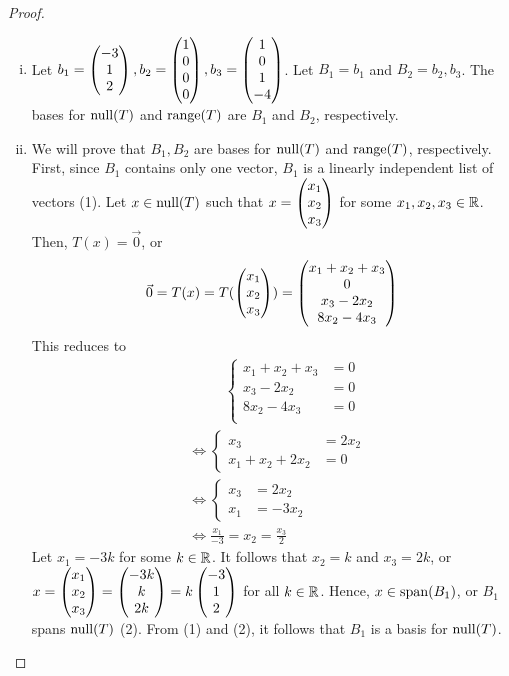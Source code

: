 \begin{proof}
    \renewcommand{\qedsymbol}{$\blacksquare$}
    \begin{enumerate}[(i)]
        \item Let $b_1=\begin{pmatrix} -3\\ 1\\ 2\end{pmatrix},b_2=\begin{pmatrix} 1\\ 0\\0 \\ 0\end{pmatrix},b_3=\begin{pmatrix} 1\\ 0\\1 \\ -4\end{pmatrix}$. Let $B_1=b_1$ and $B_2=b_2,b_3$. The bases for $\textnormal{null}(T)$ and $\textnormal{range}(T)$ are $B_1$ and $B_2$, respectively.
        \item We will prove that $B_1,B_2$ are bases for $\textnormal{null}(T)$ and $\textnormal{range}(T)$, respectively. 
        First, since $B_1$ contains only one vector, $B_1$ is a linearly independent list of vectors (1).
        Let $x\in\textnormal{null}(T)$ such that $x=\begin{pmatrix} x_1\\ x_2\\ x_3\end{pmatrix}$ for some $x_1,x_2,x_3\in\mathbb R$.
        Then, $T(x)=\vec{0}$, or 
        \[
            \begin{aligned}
                \vec{0} = T(x) = T(\begin{pmatrix} x_1\\ x_2\\ x_3\end{pmatrix}) = \begin{pmatrix} x_1+x_2+x_3\\ 0\\x_3-2x_2 \\ 8x_2-4x_3\end{pmatrix}      
            \end{aligned}
        \]
        This reduces to
        \begin{align*}
            &\qquad \ \ \,
            \begin{cases}
                x_1+x_2+x_3&=0\\
                x_3-2x_2&=0\\
                8x_2-4x_3&=0\\
            \end{cases}\\&\iff
            \begin{cases}
                x_3&=2x_2\\
                x_1+x_2+2x_2&=0
            \end{cases}\\&\iff
            \begin{cases}
                x_3&=2x_2\\
                x_1&=-3x_2
            \end{cases}\\
            &\iff \frac{x_1}{-3}=x_2=\frac{x_3}{2}
        \end{align*}
        Let $x_1=-3k$ for some $k\in\mathbb R$. It follows that $x_2=k$ and $x_3=2k$, or $x=\begin{pmatrix} x_1\\ x_2\\ x_3\end{pmatrix}=\begin{pmatrix} -3k\\ k\\ 2k\end{pmatrix}=k \begin{pmatrix} -3\\ 1\\ 2\end{pmatrix}$ for all $k\in\mathbb R$. Hence, $x\in\textnormal{span}(B_1)$, or $B_1$ spans $\textnormal{null}(T)$ (2).
        From (1) and (2), it follows that $B_1$ is a basis for $\textnormal{null}(T)$.


\end{enumerate}
\end{proof}
